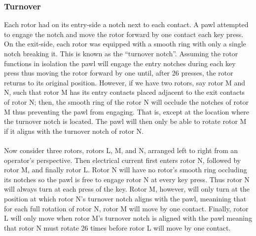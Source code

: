 \subsubsection{Turnover}
Each rotor had on its entry-side a notch next to each contact. A pawl
attempted to engage
the notch and move the rotor forward by one contact each key press.
On the exit-side, each
rotor was equipped with a smooth ring with only a single notch
breaking it. This is known as the ``turnover notch''. Assuming the
rotor functions in isolation the pawl will engage the entry notches
during each key press thus moving the rotor forward by one until,
after 26 presses, the rotor returns to its original position.
However, if we have two rotors, say rotor M and N, such that rotor M
has its entry contacts placed adjacent to the exit contacts of rotor
N; then, the smooth ring of the rotor N will occlude the notches of
rotor M thus preventing the pawl from engaging. That is, except at
the location where the turnover notch is located. The pawl will then
only be able to rotate rotor M if it aligns with the turnover notch of rotor N.
\\\\Now consider three rotors, rotors L, M, and N, arranged left to
right from an operator's perspective. Then electrical current first
enters rotor N, followed by rotor M, and finally rotor L. Rotor N
will have no rotor's smooth ring occluding its notches so the pawl is
free to engage rotor N at every key press. Thus rotor N will always
turn at each press of the key. Rotor M, however, will only turn at
the position at which rotor N's turnover notch aligns with the pawl,
meanining that for each full rotation of rotor N, rotor M will move
by one contact. Finally, rotor L will only move when rotor M's
turnover notch is aligned with the pawl meaning that rotor N must
rotate 26 times before rotor L will move by one contact.


